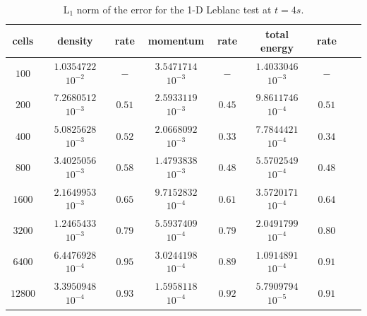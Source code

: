 \documentclass[preprint,10pt]{elsarticle}
\begin{document}
\begin{table}[!htbp]
\begin{center}
 \caption{\label{tbl:l1_norm_leblanc} L$_1$ norm of the error for the 1-D Leblanc test at $t=4s$.}
 \begin{tabular}{|c|c|c|c|c|c|c|c|c|}
 \hline
  cells & density               & rate         & momentum              & rate          & total energy          & rate         \\  \hline
$100$   & $1.0354722$ $10^{-2}$ & $-$          & $3.5471714$ $10^{-3}$ & $-$           & $1.4033046$ $10^{-3}$ & $-$          \\  \hline
$200$   & $7.2680512$ $10^{-3}$ & $0.51$ & $2.5933119$ $10^{-3}$ & $0.45$  & $9.8611746$ $10^{-4}$ & $0.51$  \\  \hline
$400$   & $5.0825628$ $10^{-3}$ & $0.52$ & $2.0668092$ $10^{-3}$ & $0.33$  & $7.7844421$ $10^{-4}$ & $0.34$ \\  \hline
$800$   & $3.4025056$ $10^{-3}$ & $0.58$ & $1.4793838$ $10^{-3}$ & $0.48$  & $5.5702549$ $10^{-4}$ & $0.48$ \\  \hline
$1600$  & $2.1649953$ $10^{-3}$ & $0.65$ & $9.7152832$ $10^{-4}$ & $0.61$   & $3.5720171$ $10^{-4}$ & $0.64$ \\  \hline
$3200$  & $1.2465433$ $10^{-3}$ & $0.79$ & $5.5937409$ $10^{-4}$ & $0.79$  & $2.0491799$ $10^{-4}$ & $0.80$ \\  \hline
$6400$  & $6.4476928$ $10^{-4}$ & $0.95$ & $3.0244198$ $10^{-4}$ & $0.89$  & $1.0914891$ $10^{-4}$ & $0.91$ \\  \hline
$12800$ & $3.3950948$ $10^{-4}$ & $0.93$ & $1.5958118$ $10^{-4}$ & $0.92$   & $5.7909794$ $10^{-5}$ & $0.91$ \\  \hline
 \end{tabular}
\end{center}
\end{table}
%
\end{document}
